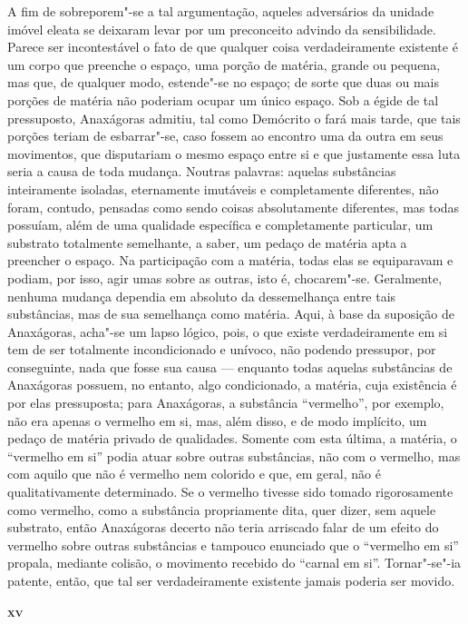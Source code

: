 A fim de sobreporem"-se a tal argumentação, aqueles adversários da unidade
imóvel eleata se deixaram levar por um preconceito advindo da sensibilidade.
Parece ser incontestável o fato de que qualquer coisa verdadeiramente
existente é um corpo que preenche o espaço, uma porção de matéria, grande ou
pequena, mas que, de qualquer modo, estende"-se no espaço; de sorte que duas
ou mais porções de matéria não poderiam ocupar um único espaço. Sob a égide
de tal pressuposto, Anaxágoras admitiu, tal como Demócrito o fará mais tarde,
que tais porções teriam de esbarrar"-se, caso fossem ao encontro uma da outra
em seus movimentos, que disputariam o mesmo espaço entre si e que justamente
essa luta seria a causa de toda mudança. Noutras palavras: aquelas
substâncias inteiramente isoladas, eternamente imutáveis e completamente
diferentes, não foram, contudo, pensadas como sendo coisas absolutamente
diferentes, mas todas possuíam, além de uma qualidade específica e
completamente particular, um substrato totalmente semelhante, a saber, um
pedaço de matéria apta a preencher o espaço. Na participação com a matéria,
todas elas se equiparavam e podiam, por isso, agir umas sobre as outras, isto
é, chocarem"-se. Geralmente, nenhuma mudança dependia em absoluto da
dessemelhança entre tais substâncias, mas de sua semelhança como matéria.
Aqui, à base da suposição de Anaxágoras, acha"-se um lapso lógico, pois, o
que existe verdadeiramente em si tem de ser totalmente incondicionado e
unívoco, não podendo pressupor, por conseguinte, nada que fosse sua causa ---
enquanto todas aquelas substâncias de Anaxágoras possuem, no entanto, algo
condicionado, a matéria, cuja existência é por elas pressuposta; para
Anaxágoras, a substância ``vermelho'', por exemplo, não era apenas o vermelho
em si, mas, além disso, e de modo implícito, um pedaço de matéria privado de
qualidades. Somente com esta última, a matéria, o ``vermelho em si'' podia
atuar sobre outras substâncias, não com o vermelho, mas com aquilo que não é
vermelho nem colorido e que, em geral, não é qualitativamente determinado. Se
o vermelho tivesse sido tomado rigorosamente como vermelho, como a substância
propriamente dita, quer dizer, sem aquele substrato, então Anaxágoras decerto
não teria arriscado falar de um efeito do vermelho sobre outras substâncias e
tampouco enunciado que o ``vermelho em si'' propala, mediante colisão, o
movimento recebido do ``carnal em si''. Tornar"-se"-ia patente, então, que
tal ser verdadeiramente existente jamais poderia ser movido.

\bigskip
\textsc{\textbf{xv}}
\bigskip

